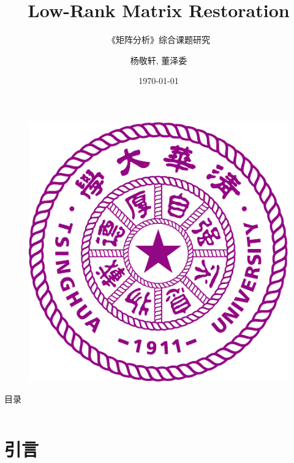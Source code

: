 \documentclass{beamer}
\author{杨敬轩, 董泽委}
\title{Low-Rank Matrix Restoration}
\subtitle{《矩阵分析》综合课题研究}
\institute[智能交通实验室]{系统工程研究所, 智能交通实验室}
\date{\today}
\begin{document}
\heiti
\begin{frame}
  \titlepage
  \begin{figure}[htpb]
    \centering
    \includegraphics[width=0.19\linewidth]{THU_logo.pdf}
  \end{figure}
\end{frame}

\begin{frame}{目录}
  \begin{columns}[t]
    \begin{column}{.45\textwidth}
      \tableofcontents[sections={1-4},hideallsubsections]
    \end{column}
    \begin{column}{.45\textwidth}
      \tableofcontents[sections={5-8},hideallsubsections]
    \end{column}
  \end{columns}
\end{frame}




\section{引言}
\end{document}
